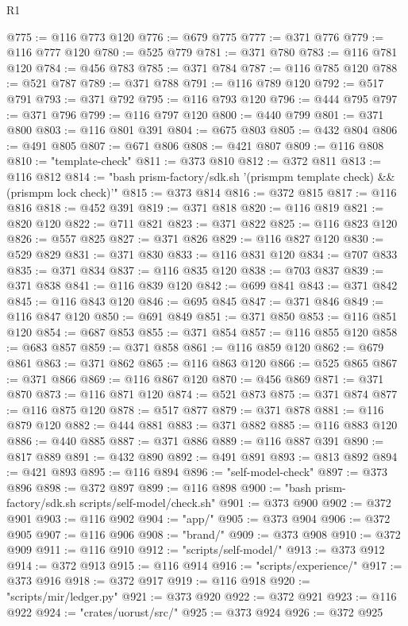 \begin{lexlean}{R1}
\begin{coremodule}
@775 := @116 @773 @120
@776 := @679 @775
@777 := @371 @776
@779 := @116 @777 @120
@780 := @525 @779
@781 := @371 @780
@783 := @116 @781 @120
@784 := @456 @783
@785 := @371 @784
@787 := @116 @785 @120
@788 := @521 @787
@789 := @371 @788
@791 := @116 @789 @120
@792 := @517 @791
@793 := @371 @792
@795 := @116 @793 @120
@796 := @444 @795
@797 := @371 @796
@799 := @116 @797 @120
@800 := @440 @799
@801 := @371 @800
@803 := @116 @801 @391
@804 := @675 @803
@805 := @432 @804
@806 := @491 @805
@807 := @671 @806
@808 := @421 @807
@809 := @116 @808
@810 := "template-check"
@811 := @373 @810
@812 := @372 @811
@813 := @116 @812
@814 := "bash prism-factory/sdk.sh '(prismpm template check) && (prismpm lock check)'"
@815 := @373 @814
@816 := @372 @815
@817 := @116 @816
@818 := @452 @391
@819 := @371 @818
@820 := @116 @819
@821 := @820 @120
@822 := @711 @821
@823 := @371 @822
@825 := @116 @823 @120
@826 := @557 @825
@827 := @371 @826
@829 := @116 @827 @120
@830 := @529 @829
@831 := @371 @830
@833 := @116 @831 @120
@834 := @707 @833
@835 := @371 @834
@837 := @116 @835 @120
@838 := @703 @837
@839 := @371 @838
@841 := @116 @839 @120
@842 := @699 @841
@843 := @371 @842
@845 := @116 @843 @120
@846 := @695 @845
@847 := @371 @846
@849 := @116 @847 @120
@850 := @691 @849
@851 := @371 @850
@853 := @116 @851 @120
@854 := @687 @853
@855 := @371 @854
@857 := @116 @855 @120
@858 := @683 @857
@859 := @371 @858
@861 := @116 @859 @120
@862 := @679 @861
@863 := @371 @862
@865 := @116 @863 @120
@866 := @525 @865
@867 := @371 @866
@869 := @116 @867 @120
@870 := @456 @869
@871 := @371 @870
@873 := @116 @871 @120
@874 := @521 @873
@875 := @371 @874
@877 := @116 @875 @120
@878 := @517 @877
@879 := @371 @878
@881 := @116 @879 @120
@882 := @444 @881
@883 := @371 @882
@885 := @116 @883 @120
@886 := @440 @885
@887 := @371 @886
@889 := @116 @887 @391
@890 := @817 @889
@891 := @432 @890
@892 := @491 @891
@893 := @813 @892
@894 := @421 @893
@895 := @116 @894
@896 := "self-model-check"
@897 := @373 @896
@898 := @372 @897
@899 := @116 @898
@900 := "bash prism-factory/sdk.sh scripts/self-model/check.sh"
@901 := @373 @900
@902 := @372 @901
@903 := @116 @902
@904 := "app/"
@905 := @373 @904
@906 := @372 @905
@907 := @116 @906
@908 := "brand/"
@909 := @373 @908
@910 := @372 @909
@911 := @116 @910
@912 := "scripts/self-model/"
@913 := @373 @912
@914 := @372 @913
@915 := @116 @914
@916 := "scripts/experience/"
@917 := @373 @916
@918 := @372 @917
@919 := @116 @918
@920 := "scripts/mir/ledger.py"
@921 := @373 @920
@922 := @372 @921
@923 := @116 @922
@924 := "crates/uorust/src/"
@925 := @373 @924
@926 := @372 @925

\end{coremodule}
\end{lexlean}
